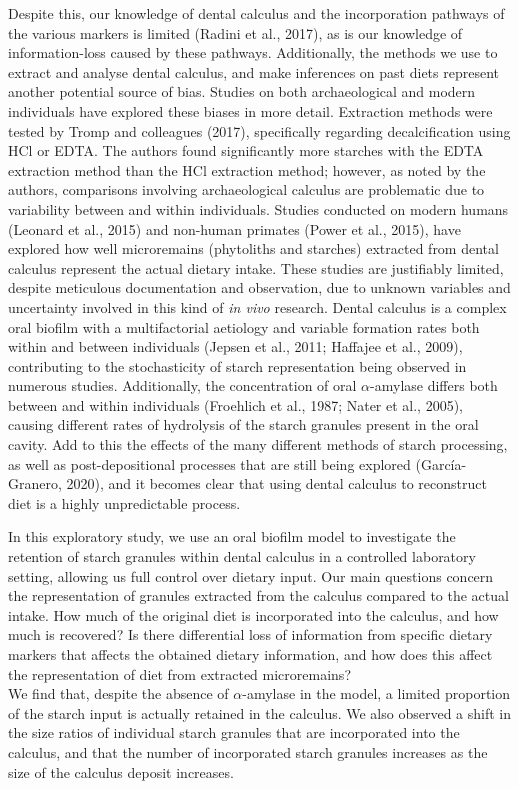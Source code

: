 \documentclass[utf8]{frontiers/frontiersSCNS}
\begin{document}
Despite this, our knowledge of dental calculus and the incorporation pathways of
the various markers is limited (Radini et al., 2017), as is our
knowledge of information-loss caused by these pathways. Additionally, the methods
we use to extract and analyse dental calculus, and make inferences on past diets
represent another potential source of bias. Studies on both archaeological and
modern individuals have explored these biases in more detail.
Extraction methods were tested
by Tromp and colleagues (2017), specifically regarding
decalcification using HCl or EDTA.
The authors found significantly more starches with the EDTA extraction method
than the HCl extraction method; however, as noted by the authors, comparisons
involving archaeological calculus are problematic due to variability between and
within individuals.
Studies conducted on modern humans (Leonard et al., 2015)
and non-human primates (Power et al., 2015),
have explored how well microremains (phytoliths and starches)
extracted from dental calculus represent the actual dietary intake.
These studies are justifiably limited,
despite meticulous documentation and observation, due to unknown variables and
uncertainty involved in this kind of \emph{in vivo} research. Dental calculus is a complex
oral biofilm with a multifactorial aetiology and variable formation rates both
within and between individuals (Jepsen et al., 2011; Haffajee et al., 2009),
contributing to
the stochasticity of starch representation being observed in numerous studies.
Additionally, the concentration of oral \(\alpha\)-amylase differs both between and
within individuals (Froehlich et al., 1987; Nater et al., 2005),
causing different rates of hydrolysis of the starch granules present in the oral
cavity. Add to this the effects of the many different methods
of starch processing, as well as post-depositional processes that are still being
explored (García-Granero, 2020), and it becomes clear that using
dental calculus to reconstruct diet is a highly unpredictable process.

In this exploratory study, we use an oral biofilm model to investigate the
retention of starch granules within dental calculus in a controlled laboratory
setting, allowing us full control over dietary input. Our main questions concern
the representation of granules extracted
from the calculus compared to the actual intake. How much of the original diet is
incorporated into the calculus, and how much is recovered?
Is there differential loss of information from specific dietary markers that affects
the obtained dietary information, and how does this affect the representation of
diet from extracted microremains?\\
We find that, despite the absence of \(\alpha\)-amylase in
the model, a limited proportion of the starch input is actually
retained in the calculus. We also observed a shift in the size ratios of individual
starch granules that are incorporated into the calculus, and that the number of
incorporated starch granules increases as the size of the calculus deposit
increases.
\end{document}
